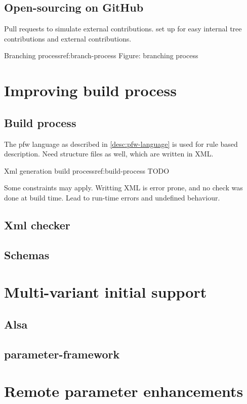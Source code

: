 \subsection{Open-sourcing on GitHub}
Pull requests to simulate external contributions.
set up for easy internal tree contributions and external contributions.

\begin{figureGraphics}{Branching process}{ref:branch-process}
    Figure: branching process
\end{figureGraphics}

\section{Improving build process}
\subsection{Build process}
The pfw language as described in \ref{desc:pfw-language} is used for rule based
description. Need structure files as well, which are written in XML.

\begin{figureGraphics}{Xml generation build process}{ref:build-process}
    TODO
\end{figureGraphics}

Some constraints may apply. Writting XML is error prone, and no check was done at
build time. Lead to run-time errors and undefined behaviour.
\subsection{Xml checker}
\subsection{Schemas}

\section{Multi-variant initial support}
\subsection{Alsa}
\subsection{parameter-framework}

\section{Remote parameter enhancements}

